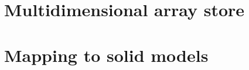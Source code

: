 \section{ Multidimensional array store}\label{sect:11-3}


\section{ Mapping to solid models}\label{sect:11-4}


%
%




